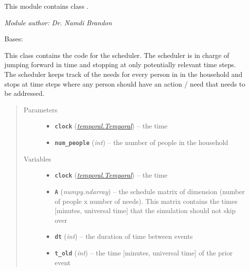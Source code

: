\documentclass[letterpaper,10pt,english]{sphinxmanual}
\begin{document}
This module contains class {\hyperref[scheduler:scheduler.Scheduler]{\emph{}}}.

\emph{Module author: Dr. Namdi Brandon}

\begin{fulllineitems}
\label{scheduler:scheduler.Scheduler}
Bases: 

This class contains the code for the scheduler. The scheduler is in charge of jumping forward in time and     stopping at only potentially relevant time steps. The scheduler keeps track of the needs for every person in     in the household and stops at time steps where any person should have an action / need that needs to be     addressed.
\begin{quote}\begin{description}
\item[{Parameters}] \leavevmode\begin{itemize}
\item {} 
\textbf{\texttt{clock}} ({\hyperref[temporal:temporal.Temporal]{\emph{\emph{temporal.Temporal}}}}) -- the time

\item {} 
\textbf{\texttt{num\_people}} (\emph{int}) -- the number of people in the household

\end{itemize}

\item[{Variables}] \leavevmode\begin{itemize}
\item {} 
\textbf{\texttt{clock}} ({\hyperref[temporal:temporal.Temporal]{\emph{\emph{temporal.Temporal}}}}) -- the time

\item {} 
\textbf{\texttt{A}} (\emph{numpy.ndarray}) -- the schedule matrix of dimension (number of people x number of needs). This matrix     contains the times {[}minutes, universal time{]} that the simulation should not skip over

\item {} 
\textbf{\texttt{dt}} (\emph{int}) -- the duration of time between events

\item {} 
\textbf{\texttt{t\_old}} (\emph{int}) -- the time {[}minutes, universal time{]} of the prior event


\end{itemize}
\end{description}
\end{quote}
\end{fulllineitems}
\end{document}
